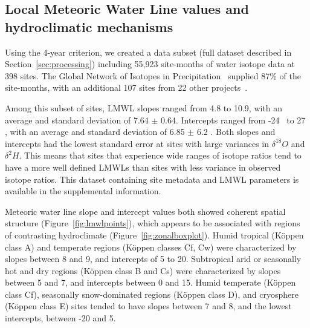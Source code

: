 \documentclass[draft, linenumbers]{agujournal2018}
\begin{document}
\subsection{Local Meteoric Water Line values and hydroclimatic mechanisms}
\label{sec:LMWLhydroclim}
Using the 4-year criterion, we created a data subset (full dataset described in Section~\ref{sec:processing}) including 55,923 site-months of water isotope data at 398 sites. The Global Network of Isotopes in Precipitation~\citep{GNIP} supplied 87\% of the site-months, with an additional 107 sites from 22 other projects~\citep{Kurita2004, Harvey2005, KuritaJAMSTEC, Price2008, Harris2010, Peng2010, Abiye2013, Hughes2013,  Moerman2013,  Scholl2014, Yamanaka2015, MayerPC, Braun2017, BrooksJRPC01, CsankPC01, Putman2017, Chen2018, FengPC01, EhleringerPC01, GrimesPC, WassenaarPC}. 

Among this subset of sites, LMWL slopes ranged from 4.8 to 10.9, with an average and standard deviation of 7.64 $\pm$ 0.64. Intercepts ranged from -24 \textperthousand\ to 27 \textperthousand, with an average and standard deviation of 6.85 $\pm$ 6.2 \textperthousand. Both slopes and intercepts had the lowest standard error at sites with large variances in $\delta^{18}O$ and $\delta^{2}H$. This means that sites that experience wide ranges of isotope ratios tend to have a more well defined LMWLs than sites with less variance in observed isotope ratios. This dataset containing site metadata and LMWL parameters is available in the supplemental information. 

Meteoric water line slope and intercept values both showed coherent spatial structure (Figure~\ref{fig:lmwlpoints}), which appears to be associated with regions of contrasting hydroclimate (Figure~\ref{fig:zonalboxplot}). Humid tropical (K{\"o}ppen class A) and temperate regions (K{\"o}ppen classes Cf, Cw) were characterized by slopes between 8 and 9, and intercepts of 5 to 20\textperthousand.  Subtropical arid or seasonally hot and dry regions (K{\"o}ppen class B and Cs) were characterized by slopes between 5 and 7, and intercepts between 0 and 15\textperthousand. Humid temperate (K{\"o}ppen class Cf), seasonally snow-dominated regions (K{\"o}ppen class D), and cryosphere (K{\"o}ppen class E) sites tended to have slopes between 7 and 8, and the lowest intercepts, between -20 and 5\textperthousand. 
\end{document}
